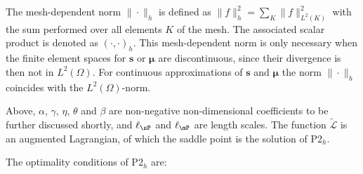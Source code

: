 
The mesh-dependent norm $\|\cdot\|_h$ is defined as 
$\|f\|_h^2 = \sum_K \|f\|^2_{L^2(K)} $
with the sum performed over all elements $K$ of the mesh. The associated scalar product is denoted as $\left ( \cdot, \cdot \right )_h$. This mesh-dependent norm is only necessary when the finite element spaces for $\mathbf{s}$ or $\boldsymbol{\mu}$ are discontinuous, since their divergence is then not in $L^2(\Omega)$. For continuous approximations of $\mathbf{s}$ and $\boldsymbol{\mu}$ the norm $\|\cdot\|_h$ coincides with the $L^2(\Omega)$-norm.

Above, $\alpha$, $\gamma$, $\eta$, $\theta$ and $\beta$ are non-negative non-dimensional coefficients to be further discussed shortly, and $\ell_{\sP}$ and $\ell_{\mP}$ are length scales. The function $\tilde{\mathcal{L}}$ is an augmented Lagrangian, of which the saddle point is the solution of P2$_h$. 

The optimality conditions of P2$_h$ are:

